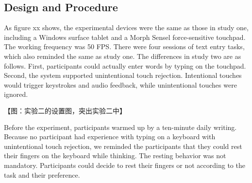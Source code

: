 \subsection{Design and Procedure}

As figure xx shows, the experimental devices were the same as those in study one, including a Windows surface tablet and a Morph Sensel force-sensitive touchpad. The working frequency was 50 FPS. There were four sessions of text entry tasks, which also reminded the same as study one. The differences in study two are as follows. First, participants could actually enter words by typing on the touchpad. Second, the system supported unintentional touch rejection. Intentional touches would trigger keystrokes and audio feedback, while unintentional touches were ignored.

【图：实验二的设置图，突出实验二中】

Before the experiment, participants warmed up by a ten-minute daily writing. Because no participant had experience with typing on a keyboard with unintentional touch rejection, we reminded the participants that they could rest their fingers on the keyboard while thinking. The resting behavior was not mandatory. Participants could decide to rest their fingers or not according to the task and their preference.



